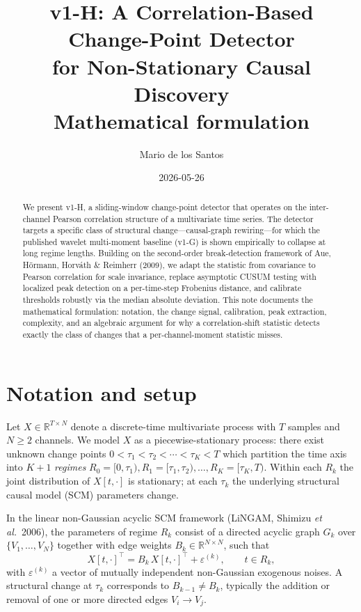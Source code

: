 \documentclass[11pt,a4paper]{article}
\title{\textbf{v1-H: A Correlation-Based Change-Point Detector\\for Non-Stationary Causal Discovery}\\[4pt]
\large Mathematical formulation}
\author{Mario de los Santos}
\date{2026-05-26}
\newcommand{\R}{\mathbb{R}}
\begin{document}
\maketitle

\begin{abstract}
We present \textsf{v1-H}, a sliding-window change-point detector that operates on the
inter-channel Pearson correlation structure of a multivariate time series.
The detector targets a specific class of structural change---causal-graph
rewiring---for which the published wavelet multi-moment baseline
(\textsf{v1-G}) is shown empirically to collapse at long regime lengths.
Building on the second-order break-detection framework of
Aue, Hörmann, Horváth \& Reimherr (2009), we adapt the
statistic from covariance to Pearson correlation for scale invariance,
replace asymptotic CUSUM testing with localized peak detection on a
per-time-step Frobenius distance, and calibrate thresholds robustly via
the median absolute deviation. This note documents the mathematical
formulation: notation, the change signal, calibration, peak extraction,
complexity, and an algebraic argument for why a correlation-shift statistic
detects exactly the class of changes that a per-channel-moment statistic
misses.
\end{abstract}

\section{Notation and setup}

Let $X \in \R^{T \times N}$ denote a discrete-time multivariate process with
$T$ samples and $N \ge 2$ channels. We model $X$ as a piecewise-stationary
process: there exist unknown change points
$0 < \tau_1 < \tau_2 < \cdots < \tau_K < T$ which partition the time axis
into $K+1$ \emph{regimes}
$R_0 = [0, \tau_1), R_1 = [\tau_1, \tau_2), \ldots, R_K = [\tau_K, T)$.
Within each $R_k$ the joint distribution of $X[t,\cdot]$ is stationary; at
each $\tau_k$ the underlying structural causal model (SCM) parameters change.

In the linear non-Gaussian acyclic SCM framework (LiNGAM,
Shimizu \emph{et al.}\ 2006), the parameters of regime $R_k$ consist of a
directed acyclic graph $G_k$ over $\{V_1, \ldots, V_N\}$ together with
edge weights $B_k \in \R^{N \times N}$, such that
\[
X[t, \cdot]^\top = B_k\, X[t, \cdot]^\top + \varepsilon^{(k)}, \qquad t \in R_k,
\]
with $\varepsilon^{(k)}$ a vector of mutually independent non-Gaussian
exogenous noises. A structural change at $\tau_k$ corresponds to
$B_{k-1} \ne B_k$, typically the addition or removal of one or more directed
edges $V_i \to V_j$.
\end{document}

